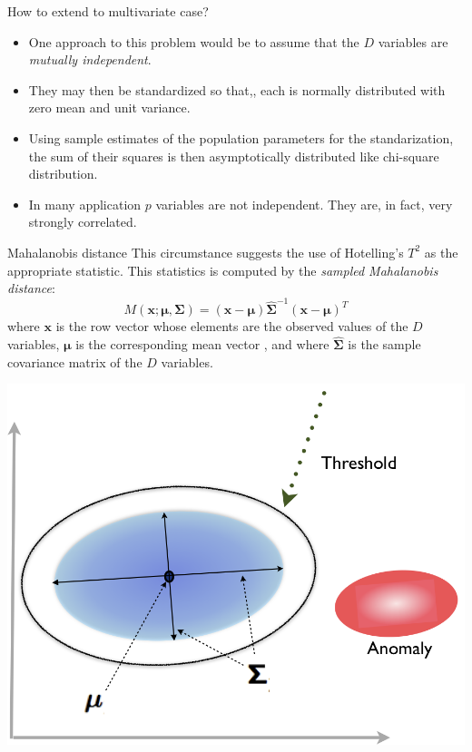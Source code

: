 \documentclass[10pt]{beamer}
\def\x{{\mathbf {x}}}
\def\dimension{D}
\newcommand{\vectorI}{\x}
\newcommand{\SSigma}{\boldsymbol\Sigma}
\newcommand{\mmu}{\boldsymbol{\mu}}
\begin{document}

\begin{frame}{How to extend to multivariate case?}
 \begin{itemize}
\item  One approach to this problem would be to assume that the $\dimension$ variables are
 \emph{mutually independent}. 
 \item They may then be standardized so that,, each is normally distributed with zero mean and unit variance. \pause
 \item  Using sample estimates of the population parameters for the standarization, the sum of their squares is then asymptotically distributed like chi-square distribution.\pause
\item  \alert{In many application $p$ variables are not independent}. They are, in fact, very strongly correlated.
\end{itemize}
\end{frame}

\begin{frame}{Mahalanobis distance}
 This circumstance suggests the use of Hotelling's $T^2$ as the appropriate statistic. This statistics is computed by the \emph{sampled Mahalanobis distance}:
 \begin{equation}
M(\vectorI;\mmu,\SSigma)=(\vectorI - \mmu) \hat{\SSigma}^{-1} (\vectorI - \mmu)^T
\end{equation}
 where $\vectorI$ is the row vector whose elements are the observed values of the $\dimension$
 variables, $\mmu$ is the corresponding mean vector , and where $\hat{\SSigma}$ is the sample covariance matrix of the $\dimension$
 variables.
\begin{center}
\includegraphics[width=.5\textwidth]{RXDetector}
\end{center}
\end{frame}
\end{document}
